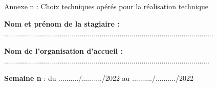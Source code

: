 \documentclass[a4paper,11pt]{article}
\makeatletter
\newcommand{\mktitle}{\@maketitle}
\makeatother
\begin{document}
\begin{center}\LARGE Annexe n : Choix techniques opérés pour la réalisation technique\end{center}
\newpage

\mktitle\vspace{-.2cm}

\noindent\textbf{Nom et prénom de la stagiaire :} .........................................................................................................\vspace{.4cm}

\noindent\textbf{Nom de l'organisation d'accueil :} .......................................................................................................\vspace{.4cm}

\noindent\textbf{Semaine n} : du ........../........../2022 au ........../........../2022\vspace{-.2cm}
\end{document}
